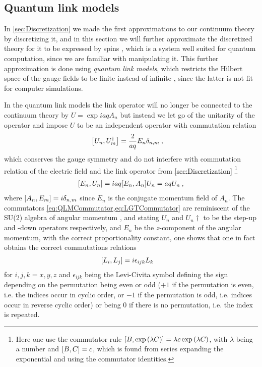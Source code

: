 \documentclass[../main.tex]{subfiles} %
\begin{document}
\subsection{Quantum link models} \label{sec:QuantumLinkModels}

In \cref{sec:Discretization} we made the first approximations to our continuum theory by discretizing it, and in this section we will further approximate the discretized theory for it to be expressed by spins \cite{Hauke_QLM_2013}, which is a system well suited for quantum computation, since we are familiar with manipulating it. This further approximation is done using \emph{quantum link models}, which restricts the Hilbert space of the gauge fields to be finite instead of infinite \cite{Barros_GaugeTheoriesWithUltracoldAtoms_2020}, since the latter is not fit for computer simulations.

In the quantum link models the link operator will no longer be connected to the continuum theory by $U = \exp{iaqA_n}$ but instead we let go of the unitarity of the operator and impose $U$ to be an independent operator with commutation relation \cite{panyella_masterThesis_2019}
\begin{align} \label{eq:QLMCommutator}
    \commutator{U_n}{U_m\dagger} &= \frac{2}{aq} E_n \delta_{n,m} \: ,
\end{align}
which conserves the gauge symmetry and do not interfere with commutation relation of the electric field and the link operator from \cref{sec:Discretization} \cite{panyella_masterThesis_2019} \footnote{Here one use the commutator rule $\commutator{B}{\exp{\lambda C}} = \lambda c \exp{\lambda C} $, with $\lambda$ being a number and $\commutator{B}{C} = c$, which is found from series expanding the exponential and using the commutator identities.}
\begin{align} \label{eq:LGTCommutator}
    \commutator{E_n}{U_n} = iaq \commutator{E_n}{A_n} U_n = aq U_n \: ,
\end{align}
where $\commutator{A_n}{E_m} = i \delta_{n,m}$ since $E_n$ is the conjugate momentum field of $A_n$. The commutators \cref{eq:QLMCommutator,eq:LGTCommutator} are reminiscent of the SU(2) algebra of angular momentum \cite{Barros_GaugeTheoriesWithUltracoldAtoms_2020, widmer_PhD_2dQuantumLinkModels_2015}, and stating $U_n$ and $U_n\dagger$ to be the step-up and -down operators respectively, and $E_n$ be the $z$-component of the angular momentum, with the correct proportionality constant, one shows that one in fact obtains the correct commutations relations
\begin{align}
    \commutator{L_i}{L_j} &= i \epsilon_{ijk}L_k
\end{align}
for $i,j,k = x,y,z$ and $\epsilon_{ijk}$ being the Levi-Civita symbol defining the sign depending on the permutation being even or odd ($+1$ if the permutation is even, i.e. the indices occur in cyclic order, or $-1$ if the permutation is odd, i.e. indices occur in reverse cyclic order) or being $0$ if there is no permutation, i.e. the index is repeated.
\end{document}
